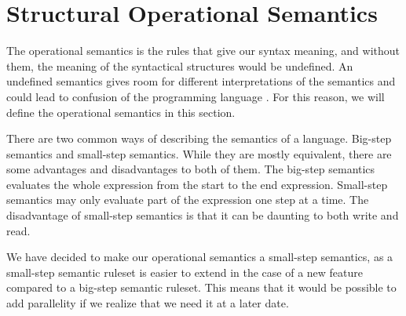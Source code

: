 \section{Structural Operational Semantics}
The operational semantics is the rules that give our syntax meaning, and without them, the meaning of the syntactical structures would be undefined. An undefined semantics gives room for different interpretations of the semantics and could lead to confusion of the programming language \cite{syntax-and-semantics}. For this reason, we will define the operational semantics in this section.

There are two common ways of describing the semantics of a language. Big-step semantics and small-step semantics. While they are mostly equivalent, there are some advantages and disadvantages to both of them. The big-step semantics evaluates the whole expression from the start to the end expression. Small-step semantics may only evaluate part of the expression one step at a time. The disadvantage of small-step semantics is that it can be daunting to both write and read.

We have decided to make our operational semantics a small-step semantics, as a small-step semantic ruleset is easier to extend in the case of a new feature compared to a big-step semantic ruleset. This means that it would be possible to add parallelity if we realize that we need it at a later date.


